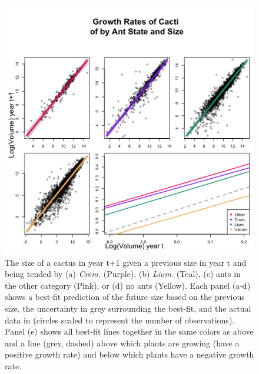\documentclass[12pt,a4paper]{article}
\begin{document}
\begin{figure}[!ht]
	\centering
	\includegraphics{Figures/grow_panel.png}
	\caption{The size of a cactus in year t+1 given a previous size in year t and being tended by (a) \textit{Crem.} (Purple), (b) \textit{Liom.} (Teal), (c) ants in the other category (Pink), or (d) no ants (Yellow). Each panel (a-d) shows a best-fit prediction of the future size based on the previous size, the uncertainty in grey surrounding the best-fit, and the actual data in (circles scaled to represent the number of observations). Panel (e) shows all best-fit lines together in the same colors as above and a line (grey, dashed) above which plants are growing (have a positive growth rate) and below which plants have a negative growth rate.}
	\label{fig:grow}
\end{figure}
\end{document}
